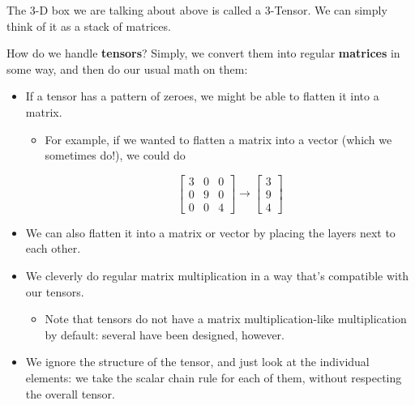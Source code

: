         \miniex The 3-D box we are talking about above is called a 3-Tensor. We can simply think of it as a stack of matrices.
        
        How do we handle \textbf{tensors}? Simply, we convert them into regular \textbf{matrices} in some way, and then do our usual math on them:
        
        \begin{itemize}
            \item If a tensor has a pattern of zeroes, we might be able to flatten it into a matrix.
                \begin{itemize}
                    \item For example, if we wanted to flatten a matrix into a vector (which we sometimes do!), we could do
                    
                    \begin{equation}
                        \begin{bmatrix}
                            3 & 0 & 0\\
                            0 & 9 & 0\\
                            0 & 0 & 4
                        \end{bmatrix}
                        \rightarrow
                        \begin{bmatrix}
                            3\\9\\4
                        \end{bmatrix}
                    \end{equation}
                    
                \end{itemize}
                
            \item We can also flatten it into a matrix or vector by placing the layers next to each other.
            
            \item We cleverly do regular matrix multiplication in a way that's compatible with our tensors.
                \begin{itemize}
                    \item Note that tensors do not have a matrix multiplication-like multiplication by default: several have been designed, however.
                \end{itemize}
                
            \item We ignore the structure of the tensor, and just look at the individual elements: we take the scalar chain rule for each of them, without respecting the overall tensor.\\
        \end{itemize}
        
